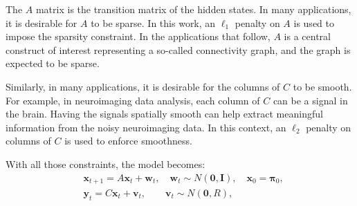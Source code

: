 \documentclass[fleqn,12pt]{article}
\providecommand{\mb}[1]{\boldsymbol{#1}}
\newcommand{\bx}{\mb{x}}
\newcommand{\by}{\mb{y}}
\begin{document}
The $A$ matrix is the transition matrix of the hidden states. In many applications, it is desirable for $A$ to be sparse. In this work, an $\ell_1$ penalty on $A$ is used to impose the sparsity constraint. In the applications that follow, $A$ is a central construct of interest representing a so-called connectivity graph, and the graph is expected to be sparse.

Similarly, in many applications, it is desirable for the columns of $C$ to be smooth. For example, in neuroimaging data analysis, each column of $C$ can be a signal in the brain. Having the signals spatially smooth can help extract meaningful information from the noisy neuroimaging data. In this context, an $\ell_2$ penalty on columns of $C$ is used to enforce smoothness.

With all those constraints, the model becomes:
\begin{equation}\label{eq:model0}
\begin{aligned}
	&\bx_{t+1}=A\bx_{t}+\mathbf{w}_t, \quad \mathbf{w}_t\sim N(\mathbf{0},\mathbf{I}),\quad \bx_0 = \mathbf{\pi}_0,\\
	&\by_t=C\bx_t+\mathbf{v}_t,\qquad \mathbf{v}_t\sim N(\mathbf{0},R),
\end{aligned}
\end{equation}
\end{document}
